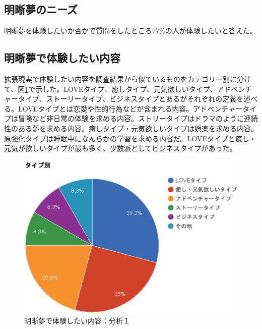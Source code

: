 \subsection{明晰夢のニーズ}
明晰夢を体験したいか否かで質問をしたところ77\%の人が体験したいと答えた。

\subsection{明晰夢で体験したい内容}
拡張現実で体験したい内容を調査結果から似ているものをカテゴリー別に分けて、図\ref{desiredDreamTpye}で示した。LOVEタイプ、癒しタイプ、元気欲しいタイプ、アドベンチャータイプ、ストーリータイプ、ビジネスタイプとあるがそれぞれの定義を述べる。LOVEタイプとは恋愛や性的行為などが含まれる内容。アドベンチャータイプは冒険など非日常の体験を求める内容。ストリータイプはドラマのように連続性のある夢を求める内容。癒しタイプ・元気欲しいタイプは娯楽を求める内容。原強化タイプは睡眠中になんらかの学習を求める内容だ。LOVEタイプと癒し・元気が欲しいタイプが最も多く、少数派としてビジネスタイプがあった。

\begin{figure}[htbp]
\begin{center}
\includegraphics[width=15cm]{eps/dreamType.eps}
\caption{明晰夢で体験したい内容：分析１}
\label{desiredDreamTpye}
\end{center}
\end{figure}

